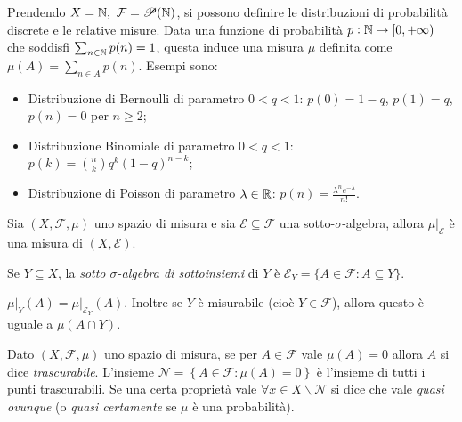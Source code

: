 \begin{example}
	Prendendo $X=\mathbb{N},\ \mathcal{F} =\mathscr{P}(\mathbb{N})$, si possono definire le distribuzioni di probabilità discrete e le relative misure. Data una funzione di probabilità $p: \mathbb{N} \rightarrow [0,+\infty)$ che soddisfi $\sum_{n\in\mathbb{N}} p(n)=1$, questa induce una misura $\mu$ definita come $\mu(A)=\sum_{n\in A} p(n)$. Esempi sono:
	\begin{itemize}
	\item Distribuzione di Bernoulli di parametro $0<q<1$: $p(0)=1-q$, $p(1)=q$, $p(n)=0$ per $n\geq 2$;
	\item Distribuzione Binomiale di parametro $0<q<1$: $\displaystyle p(k)=\binom{n}{k} q^k (1-q)^{n-k}$;
	\item Distribuzione di Poisson di parametro $\lambda\in\mathbb{R}$: $\displaystyle p(n)=\frac{\lambda^ne^{-\lambda}}{n!}$.
	\end{itemize}
\end{example}
\begin{proposition}
	Sia $(X,\mathcal{F}, \mu)$ uno spazio di misura e sia $\mathcal{E} \subseteq \mathcal{F}$ una sotto-$\sigma$-algebra, allora $\mu\lvert_{\mathcal{E}}$ è una misura di $(X,\mathcal{E})$.
\end{proposition}
\begin{definition}
	Se $Y\subseteq X$, la \emph{sotto $\sigma$-algebra di sottoinsiemi} di $Y$ è $\mathcal{E}_Y=\{A\in \mathcal{F} : A \subseteq Y\}$.
\end{definition}
\begin{exercise}
	$\mu\lvert_{Y}(A)=\mu\lvert_{\mathcal{E}_Y}(A)$. Inoltre se $Y$ è misurabile (cioè $Y\in \mathcal{F}$), allora questo è uguale a $\mu(A\cap Y)$.
\end{exercise}
\begin{definition}
	Dato $(X,\mathcal{F}, \mu)$ uno spazio di misura, se per $A\in \mathcal{F}$ vale $\mu(A)=0$ allora $A$ si dice \emph{trascurabile}. L'insieme $\mathscr{N}=\left\{A\in \mathcal{F} : \mu(A)=0 \right\}$ è l'insieme di tutti i punti trascurabili. Se una certa proprietà vale $\forall x \in X\smallsetminus \mathscr{N}$ si dice che vale \emph{quasi ovunque} (o \emph{quasi certamente} se $ \mu $ è una probabilità).
\end{definition}

